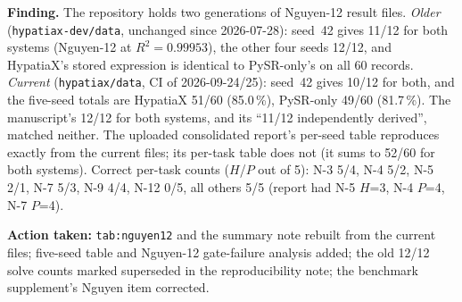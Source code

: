 \documentclass[11pt]{article}
\begin{document}
\textbf{Finding.} The repository holds two generations of Nguyen-12 result files.
\emph{Older} (\texttt{hypatiax-dev/data}, unchanged since 2026-07-28): seed~42
gives 11/12 for both systems (Nguyen-12 at $R^2=0.99953$), the other four seeds
12/12, and HypatiaX's stored expression is identical to PySR-only's on all 60
records. \emph{Current} (\texttt{hypatiax/data}, CI of 2026-09-24/25): seed~42
gives 10/12 for both, and the five-seed totals are HypatiaX 51/60 (85.0\,\%),
PySR-only 49/60 (81.7\,\%). The manuscript's 12/12 for both systems, and its
``11/12 independently derived'', matched neither. The uploaded consolidated
report's per-seed table reproduces exactly from the current files; its
per-task table does not (it sums to 52/60 for both systems). Correct
per-task counts ($H$/$P$ out of 5): N-3 5/4, N-4 5/2, N-5 2/1, N-7 5/3, N-9 4/4,
N-12 0/5, all others 5/5 (report had N-5 $H$=3, N-4 $P$=4, N-7 $P$=4).

\textbf{Action taken:} \texttt{tab:nguyen12} and the summary note rebuilt from the
current files; five-seed table and Nguyen-12 gate-failure analysis added; the old
12/12 solve counts marked superseded in the reproducibility note; the
benchmark supplement's Nguyen item corrected.
\end{document}
